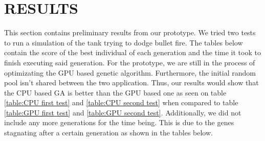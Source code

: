 \chapter{RESULTS}
This section contains preliminary results from our prototype. We tried two tests to run a simulation of the tank
trying to dodge bullet fire.  The tables below contain the score of the best individual of each generation and the time
it took to finish executing said generation. For the prototype, we are still in the process of optimizating the GPU
based genetic algorithm. Furthermore, the initial random pool isn't shared between the two application.
Thus, our results would show that the CPU based GA is better than the GPU based one as seen on table 
\ref{table:CPU first test} and \ref{table:CPU second test} when compared to table \ref{table:GPU first test} and 
\ref{table:GPU second test}. Additionally, we did not include any more generations for the time being. This is due to
the genes stagnating after a certain generation as shown in the tables below.



